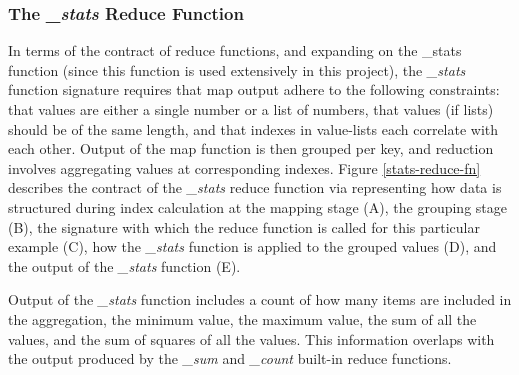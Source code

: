 \subsubsection{The \textit{\_stats} Reduce Function}
In terms of the contract of reduce functions, and expanding on the \_stats function (since this function is used extensively in this project), the \textit{\_stats} function signature requires that map output adhere to the following constraints: that values are either a single number or a list of numbers, that values (if lists) should be of the same length, and that indexes in value-lists each correlate with each other. Output of the map function is then grouped per key, and reduction involves aggregating values at corresponding indexes. Figure \ref{stats-reduce-fn} describes the contract of the \textit{\_stats} reduce function via representing how data is structured during index calculation at the mapping stage (A), the grouping stage (B), the signature with which the reduce function is called for this particular example (C), how the \textit{\_stats} function is applied to the grouped values (D), and the output of the \textit{\_stats} function (E).

Output of the \textit{\_stats} function includes a count of how many items are included in the aggregation, the minimum value, the maximum value, the sum of all the values, and the sum of squares of all the values. This information overlaps with the output produced by the \textit{\_sum} and \textit{\_count} built-in reduce functions.

